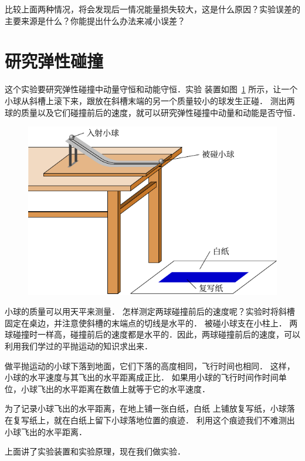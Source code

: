 比较上面两种情况，将会发现后一情况能量损失较大，这是什么原因？实验误差的主要来源是什么？你能提出什么办法来减小误差？

\section{研究弹性碰撞}
这个实验要研究弹性碰撞中动量守恒和动能守恒．实验
装置如图~\ref{fig_A_10-18} 所示，让一个小球从斜槽上滚下来，跟放在斜槽末端的另一个质量较小的球发生正碰．
测出两球的质量以及它们碰撞前后的速度，就可以研究弹性碰撞中动量和动能是否守恒．
\begin{figure}[htbp]
    \centering
    \includegraphics{fig/A/10-18.pdf}
    \caption{}\label{fig_A_10-18}
\end{figure}

小球的质量可以用天平来测量．
怎样测定两球碰撞前后的速度呢？实验时将斜槽固定在桌边，并注意使斜槽的末端点的切线是水平的．
被碰小球支在小柱上．
两球碰撞时一样高，碰撞前后的速度都是水平的．因此，两球碰撞前后的速度，可以利用我们学过的平抛运动的知识求出来．

做平抛运动的小球下落到地面，它们下落的高度相同，飞行时间也相同．
这样，小球的水平速度与其飞出的水平距离成正比．
如果用小球的飞行时间作时间单位，小球飞出的水平距离在数值上就等于它的水平速度．

为了记录小球飞出的水平距离，在地上铺一张白纸，白纸
上铺放复写纸，小球落在复写纸上，就在白纸上留下小球落地位置的痕迹．
利用这个痕迹我们不难测出小球飞出的水平距离．

上面讲了实验装置和实验原理，现在我们做实验．

